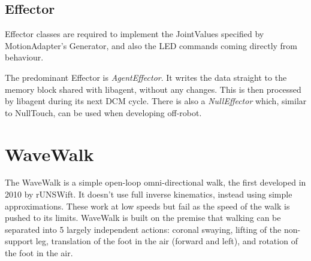 \documentclass[pdftex,11pt,a4paper]{report}
\begin{document}
\subsection{Effector}
Effector classes are required to implement the JointValues specified by
MotionAdapter's Generator, and also the LED commands coming directly from
behaviour.

The predominant Effector is \emph{AgentEffector}. It writes the data
straight to the memory block shared with libagent, without any changes.
This is then processed by libagent during its next DCM cycle. There is also
a \emph{NullEffector} which, similar to NullTouch, can be used when developing
off-robot.
\section{WaveWalk}
The WaveWalk is a simple open-loop omni-directional walk, the first
developed in 2010 by rUNSWift. It doesn't use full inverse kinematics,
instead using simple approximations. These work at low speeds but fail as
the speed of the walk is pushed to its limits. WaveWalk is built on the
premise that walking can be separated into 5 largely independent actions:
coronal swaying, lifting of the non-support leg, translation of the foot in
the air (forward and left), and rotation of the foot in the air.
\end{document}
